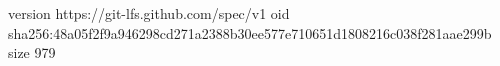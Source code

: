 version https://git-lfs.github.com/spec/v1
oid sha256:48a05f2f9a946298cd271a2388b30ee577e710651d1808216c038f281aae299b
size 979
